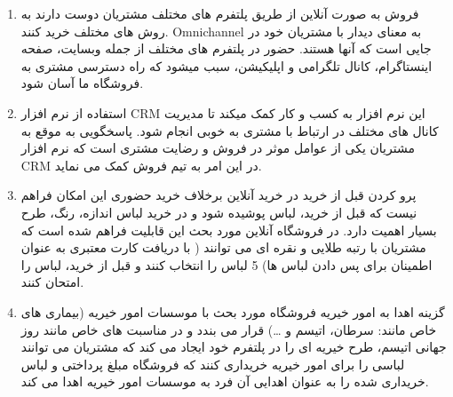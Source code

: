 \documentclass[14pt]{article}
\begin{document}
\begin{flushright}
\begin{enumerate}
\item فروش به صورت آنلاین از طریق پلتفرم های مختلف
\newline
مشتریان دوست دارند به روش های مختلف خرید کنند. Omnichannel به معنای دیدار با مشتریان خود در جایی است كه آنها هستند. حضور در پلتفرم های مختلف از جمله وبسایت، صفحه اینستاگرام، کانال تلگرامی و اپلیکیشن، سبب میشود که راه دسترسی مشتری به فروشگاه ما آسان شود.

\item استفاده از نرم افزار CRM 
\newline
این نرم افزار به کسب و کار کمک میکند تا مدیریت کانال های مختلف در ارتباط با مشتری به خوبی انجام شود. پاسخگویی به موقع به مشتریان یکی از عوامل موثر در فروش و رضایت مشتری است که نرم افزار CRM در این امر به تیم فروش کمک می نماید.

\item پرو کردن قبل از خرید
\newline
در خرید آنلاین برخلاف خرید حضوری این امکان فراهم نیست که قبل از خرید، لباس پوشیده شود و در خرید لباس اندازه، رنگ، طرح بسیار اهمیت دارد. در فروشگاه آنلاین مورد بحث این قابلیت فراهم شده است که مشتریان با رتبه طلایی و نقره ای می توانند ( با دریافت کارت معتبری به عنوان اطمینان برای پس دادن لباس ها) 5 لباس را انتخاب کنند و قبل از خرید، لباس را امتحان کنند.


\item گزینه اهدا به امور خیریه
\newline
فروشگاه مورد بحث با موسسات امور خیریه (بیماری های خاص مانند: سرطان، اتیسم و …) قرار می بندد و در مناسبت های خاص مانند روز جهانی اتیسم، طرح خیریه ای را در پلتفرم خود ایجاد می کند که مشتریان می توانند لباسی را برای امور خیریه خریداری کنند که فروشگاه مبلغ پرداختی و لباس خریداری شده را به عنوان اهدایی آن فرد به موسسات امور خیریه اهدا می کند.
\end{enumerate}
\end{flushright}
\end{document}
